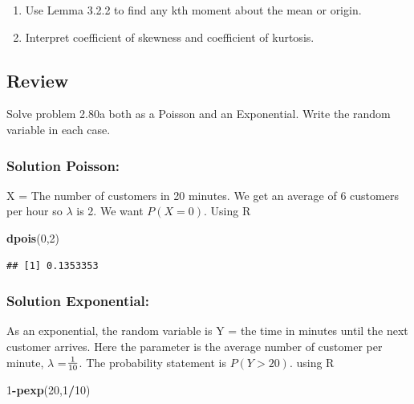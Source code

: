 \documentclass[]{book}
\newenvironment{Shaded}{\begin{snugshade}}{\end{snugshade}}
\newcommand{\KeywordTok}[1]{\textcolor[rgb]{0.13,0.29,0.53}{\textbf{#1}}}
\newcommand{\DecValTok}[1]{\textcolor[rgb]{0.00,0.00,0.81}{#1}}
\newcommand{\OperatorTok}[1]{\textcolor[rgb]{0.81,0.36,0.00}{\textbf{#1}}}
\newcommand{\NormalTok}[1]{#1}
\providecommand{\tightlist}{%
  \setlength{\itemsep}{0pt}\setlength{\parskip}{0pt}}
\theoremstyle{definition}
\theoremstyle{definition}
\theoremstyle{definition}
\theoremstyle{remark}
\begin{document}
\begin{enumerate}
\def\labelenumi{\arabic{enumi}.}
\tightlist
\item
  Use Lemma 3.2.2 to find any kth moment about the mean or origin.
\item
  Interpret coefficient of skewness and coefficient of kurtosis.
\end{enumerate}

\subsection{Review}\label{review-1}

Solve problem 2.80a both as a Poisson and an Exponential. Write the
random variable in each case.

\subsubsection{Solution Poisson:}\label{solution-poisson}

X = The number of customers in 20 minutes. We get an average of 6
customers per hour so \(\lambda\) is 2. We want \(P(X=0)\). Using R

\begin{Shaded}
\begin{Highlighting}[]
\KeywordTok{dpois}\NormalTok{(}\DecValTok{0}\NormalTok{,}\DecValTok{2}\NormalTok{)}
\end{Highlighting}
\end{Shaded}

\begin{verbatim}
## [1] 0.1353353
\end{verbatim}

\subsubsection{Solution Exponential:}\label{solution-exponential}

As an exponential, the random variable is Y = the time in minutes until
the next customer arrives. Here the parameter is the average number of
customer per minute, \(\lambda\) =\({1 \over 10}\). The probability
statement is \(P(Y>20)\). using R

\begin{Shaded}
\begin{Highlighting}[]
\DecValTok{1}\OperatorTok{-}\KeywordTok{pexp}\NormalTok{(}\DecValTok{20}\NormalTok{,}\DecValTok{1}\OperatorTok{/}\DecValTok{10}\NormalTok{)}
\end{Highlighting}
\end{Shaded}
\end{document}
